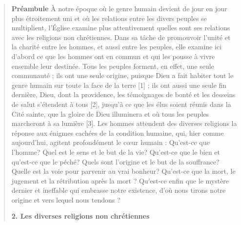 \begin{quote}
  \textbf{  Préambule}
À notre époque où le genre humain devient de jour en jour plus étroitement uni et où les relations entre les divers peuples se multiplient, l’Église examine plus attentivement quelles sont ses relations avec les religions non chrétiennes. Dans sa tâche de promouvoir l’unité et la charité entre les hommes, et aussi entre les peuples, elle examine ici d’abord ce que les hommes ont en commun et qui les pousse à vivre ensemble leur destinée.
Tous les peuples forment, en effet, une seule communauté ; ils ont une seule origine, puisque Dieu a fait habiter tout le genre humain sur toute la face de la terre [1] ; ils ont aussi une seule fin dernière, Dieu, dont la providence, les témoignages de bonté et les desseins de salut s’étendent à tous [2], jusqu’à ce que les élus soient réunis dans la Cité sainte, que la gloire de Dieu illuminera et où tous les peuples marcheront à sa lumière [3].
Les hommes attendent des diverses religions la réponse aux énigmes cachées de la condition humaine, qui, hier comme aujourd’hui, agitent profondément le cœur humain : Qu’est-ce que l’homme? Quel est le sens et le but de la vie? Qu’est-ce que le bien et qu’est-ce que le péché? Quels sont l’origine et le but de la souffrance? Quelle est la voie pour parvenir au vrai bonheur? Qu’est-ce que la mort, le jugement et la rétribution après la mort ? Qu’est-ce enfin que le mystère dernier et ineffable qui embrasse notre existence, d’où nous tirons notre origine et vers lequel nous tendons ?


\textbf{2. Les diverses religions non chrétiennes}



\end{quote}
